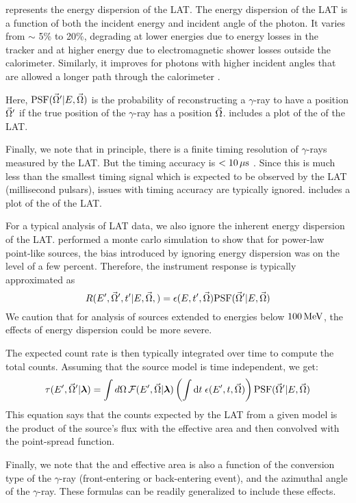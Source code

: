\edisp represents the energy dispersion of the LAT.  The energy dispersion
of the LAT is a function of both the incident energy and incident angle
of the photon. It varies from $\sim$ 5\% to 20\%, degrading at lower
energies due to energy losses in the tracker and at higher energy due
to electromagnetic shower losses outside the calorimeter. Similarly,
it improves for photons with higher incident angles that are allowed a
longer path through the calorimeter \citep{ackermann_2012a_fermi-large}.

Here, $\text{PSF}(\vec\Omega'|E,\vec\Omega)$ is the probability of
reconstructing a $\gamma$-ray to have a position $\vec\Omega'$ if
the true position of the $\gamma$-ray has a position $\vec\Omega$.
 includes a plot of the \psf of the \ac{LAT}.

Finally, we note that in principle, there is a finite timing resolution
of $\gamma$-rays measured by the \ac{LAT}. But the timing accuracy is
$<10\,\mu\text{s}$ \citep{atwood_2009a_large-telescope}. Since
this is much less than the smallest timing signal which is expected to
be observed by the \ac{LAT} (millisecond pulsars), issues with timing
accuracy are typically ignored.   includes
a plot of the \edisp of the \ac{LAT}.

For a typical analysis of \ac{LAT} data, we also ignore the inherent
energy dispersion of the \ac{LAT}.  \cite{ackermann_2012a_fermi-large}
performed a monte carlo simulation to show that for power-law point-like
sources, the bias introduced by ignoring energy dispersion was on the
level of a few percent.  Therefore, the instrument response is typically
approximated as
\begin{equation}
  R(E',\vec\Omega',t'|E,\vec\Omega,) = 
  \epsilon(E,t',\vec\Omega) \text{PSF}(\vec\Omega'|E,\vec\Omega)
\end{equation}
We caution that for analysis of sources extended to energies below
$100\,\text{MeV}$, the effects of energy dispersion could be more
severe.

The expected count rate is then typically integrated over time to compute
the total counts. Assuming that the source model is time independent,
we get:
\begin{equation}\eqnlabel{differential_model_counts}
  \eventrate(\energy',\solidangle'|\modelparams)
  = \int \dsolidangle \,
  \fluxdensity(\energy',\vec\Omega|\modelparams) 
\left(
\int \dtime \intspace \effectivearea(\energy',\time,\solidangle) 
\right)
\psf(\solidangle'|E,\solidangle)
\end{equation}
This equation says that the counts expected by the LAT from a given
model is the product of the source's flux with the effective area and
then convolved with the point-spread function.

Finally, we note that the \psf and effective area is also a function of
the conversion type of the $\gamma$-ray (front-entering or back-entering
event), and the azimuthal angle of the $\gamma$-ray. These formulas can
be readily generalized to include these effects.
